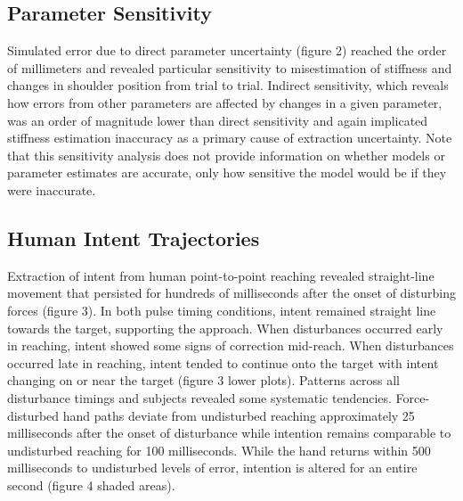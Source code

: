\documentclass[10pt]{article}
\begin{document}
\subsection*{Parameter Sensitivity}
Simulated error due to direct parameter uncertainty (figure 2) reached the order of millimeters and revealed particular sensitivity to misestimation of stiffness and changes in shoulder position from trial to trial. Indirect sensitivity, which reveals how errors from other parameters are affected by changes in a given parameter, was an order of magnitude lower than direct sensitivity and again implicated stiffness estimation inaccuracy as a primary cause of extraction uncertainty. Note that this sensitivity analysis does not provide information on whether models or parameter estimates are accurate, only how sensitive the model would be if they were inaccurate. 

\subsection*{Human Intent Trajectories}
Extraction of intent from human point-to-point reaching revealed straight-line movement that persisted for hundreds of milliseconds after the onset of disturbing forces (figure 3). In both pulse timing conditions, intent remained straight line towards the target, supporting the approach.  When disturbances occurred early in reaching, intent showed some signs of correction mid-reach. When disturbances occurred late in reaching, intent tended to continue onto the target with intent changing on or near the target (figure 3 lower plots). Patterns across all disturbance timings and subjects revealed some systematic tendencies. Force-disturbed hand paths deviate from undisturbed reaching approximately 25 milliseconds after the onset of disturbance while intention remains comparable to undisturbed reaching for 100 milliseconds. While the hand returns within 500 milliseconds to undisturbed levels of error, intention is altered for an entire second (figure 4 shaded areas).
\end{document}
